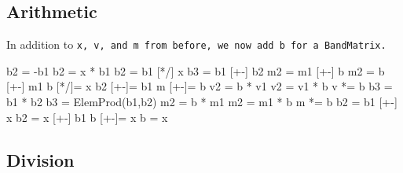 \subsection{Arithmetic}
\label{BandMatrix_Arithmetic}

In addition to \tt{x}, \tt{v}, and \tt{m} from before, we now add \tt{b} 
for a \tt{BandMatrix}.

\begin{tmvcode}
b2 = -b1
b2 = x * b1
b2 = b1 [*/] x
b3 = b1 [+-] b2
m2 = m1 [+-] b
m2 = b [+-] m1
b [*/]= x
b2 [+-]= b1
m [+-]= b
v2 = b * v1
v2 = v1 * b
v *= b
b3 = b1 * b2
b3 = ElemProd(b1,b2)
m2 = b * m1
m2 = m1 * b
m *= b
b2 = b1 [+-] x
b2 = x [+-] b1
b [+-]= x
b = x
\end{tmvcode}

\subsection{Division}
\label{BandMatrix_Division}

